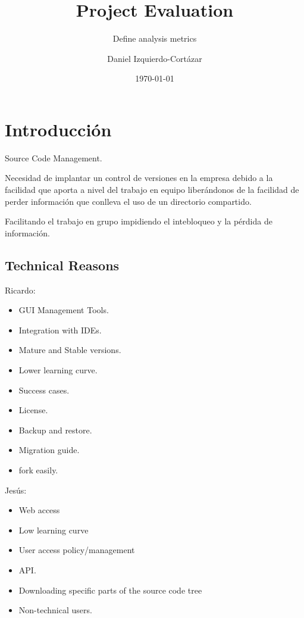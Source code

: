 \documentclass[11pt]{scrartcl}
\title{\textbf{Project Evaluation}}
\subtitle{Define analysis metrics}
\author{Daniel Izquierdo-Cortázar}
\date{\today}
\begin{document}
\maketitle

\newpage

\tableofcontents

\newpage

\section{Introducción}

Source Code Management.

Necesidad de implantar un control de versiones en la empresa debido a la facilidad que aporta a nivel del trabajo en equipo liberándonos de la facilidad de perder información que conlleva el uso de un directorio compartido.

Facilitando el trabajo en grupo impidiendo el intebloqueo y la pérdida de información.

\subsection{Technical Reasons}

Ricardo:
\begin{itemize}
    \item GUI Management Tools.
    \item Integration with IDEs.
    \item Mature and Stable versions.
    \item Lower learning curve.
    \item Success cases.
    \item License.
    \item Backup and restore.
    \item Migration guide.
    \item fork easily.
\end{itemize}

Jesús:
\begin{itemize}
    \item Web access
    \item Low learning curve
    \item User access policy/management
    \item API.
    \item Downloading specific parts of the source code tree
    \item Non-technical users.
\end{itemize}
\end{document}

